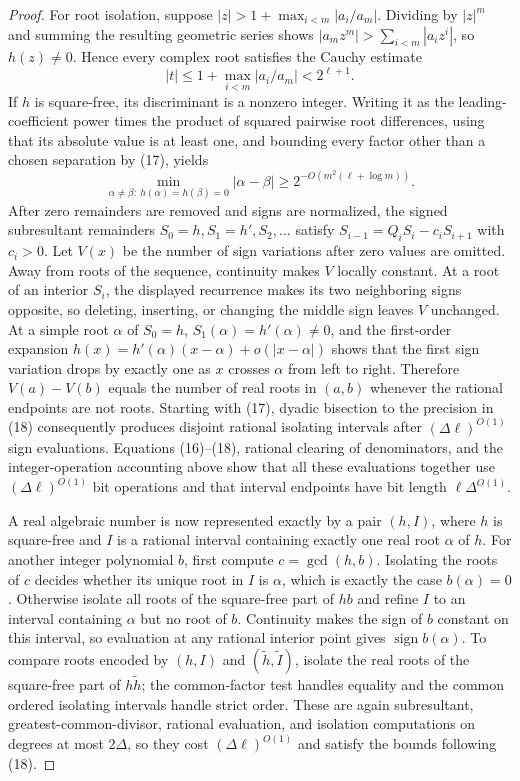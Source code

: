 \documentclass{article}
\begin{document}
\begin{proof}
For root isolation, suppose \(|z|>1+\max_{i<m}|a_i/a_m|\).  Dividing by \(|z|^m\) and summing the resulting geometric series shows \(|a_mz^m|>\sum_{i<m}|a_i z^i|\), so \(h(z)\ne0\).  Hence every complex root satisfies the Cauchy estimate
\[
|t|\le 1+\max_{i<m}|a_i/a_m|<2^{\ell+1}.
\tag{17}
\]
If \(h\) is square-free, its discriminant is a nonzero integer.  Writing it as the leading-coefficient power times the product of squared pairwise root differences, using that its absolute value is at least one, and bounding every factor other than a chosen separation by (17), yields
\[
\min_{\alpha\ne\beta:\ h(\alpha)=h(\beta)=0}|\alpha-\beta|
\ge 2^{-O(m^2(\ell+\log m))}.
\tag{18}
\]
After zero remainders are removed and signs are normalized, the signed subresultant remainders \(S_0=h,S_1=h',S_2,\ldots\) satisfy \(S_{i-1}=Q_iS_i-c_iS_{i+1}\) with \(c_i>0\).  Let \(V(x)\) be the number of sign variations after zero values are omitted.  Away from roots of the sequence, continuity makes \(V\) locally constant.  At a root of an interior \(S_i\), the displayed recurrence makes its two neighboring signs opposite, so deleting, inserting, or changing the middle sign leaves \(V\) unchanged.  At a simple root \(\alpha\) of \(S_0=h\), \(S_1(\alpha)=h'(\alpha)\ne0\), and the first-order expansion \(h(x)=h'(\alpha)(x-\alpha)+o(|x-\alpha|)\) shows that the first sign variation drops by exactly one as \(x\) crosses \(\alpha\) from left to right.  Therefore \(V(a)-V(b)\) equals the number of real roots in \((a,b)\) whenever the rational endpoints are not roots.  Starting with (17), dyadic bisection to the precision in (18) consequently produces disjoint rational isolating intervals after \((\Delta\ell)^{O(1)}\) sign evaluations.  Equations (16)--(18), rational clearing of denominators, and the integer-operation accounting above show that all these evaluations together use \((\Delta\ell)^{O(1)}\) bit operations and that interval endpoints have bit length \(\ell\Delta^{O(1)}\).

A real algebraic number is now represented exactly by a pair \((h,I)\), where \(h\) is square-free and \(I\) is a rational interval containing exactly one real root \(\alpha\) of \(h\).  For another integer polynomial \(b\), first compute \(c=\gcd(h,b)\).  Isolating the roots of \(c\) decides whether its unique root in \(I\) is \(\alpha\), which is exactly the case \(b(\alpha)=0\).  Otherwise isolate all roots of the square-free part of \(hb\) and refine \(I\) to an interval containing \(\alpha\) but no root of \(b\).  Continuity makes the sign of \(b\) constant on this interval, so evaluation at any rational interior point gives \(\operatorname{sign}b(\alpha)\).  To compare roots encoded by \((h,I)\) and \((\widetilde h,\widetilde I)\), isolate the real roots of the square-free part of \(h\widetilde h\); the common-factor test handles equality and the common ordered isolating intervals handle strict order.  These are again subresultant, greatest-common-divisor, rational evaluation, and isolation computations on degrees at most \(2\Delta\), so they cost \((\Delta\ell)^{O(1)}\) and satisfy the bounds following (18).


\end{proof}
\end{document}
